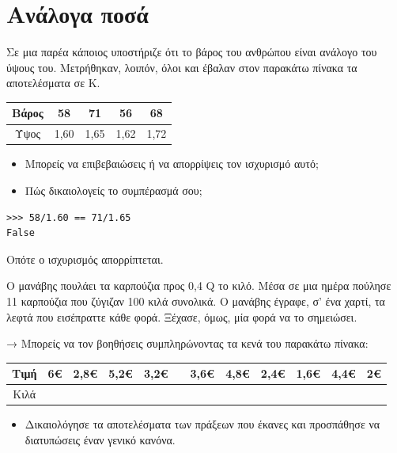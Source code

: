 \section{Ανάλογα ποσά}
\begin{exercise}
Σε	μια	παρέα	κάποιος	υποστήριζε	ότι	το	βάρος	του	ανθρώπου	είναι	ανάλογο	του	ύψους	του. Μετρήθηκαν,	λοιπόν,	όλοι	και	έβαλαν	στον	παρακάτω	πίνακα	τα	αποτελέσματα σε Κ.
\begin{table}
\begin{tabular}{|c|c|c|c|c|}
\hline
Βάρος& 58& 71& 56& 68\\\hline
Ύψος & 1,60&1,65&1,62&1,72\\\hline
\end{tabular}
\end{table}
\begin{itemize}
\item Μπορείς	να	επιβεβαιώσεις	ή	να	απορρίψεις	τον		ισχυρισμό	αυτό;		
\item Πώς	δικαιολογείς	το	συμπέρασμά	σου;
\end{itemize}
\end{exercise}
\begin{lstlisting}
>>> 58/1.60 == 71/1.65
False
\end{lstlisting}
Οπότε ο ισχυρισμός απορρίπτεται.
\begin{exercise}
O	μανάβης	πουλάει	τα	καρπούζια	προς	0,4	Q
	το	κιλό.	Μέσα	σε	μια	ημέρα	πούλησε	11	καρπούζια	που	ζύγιζαν	100	κιλά	συνολικά.	Ο	μανάβης	έγραφε,	σ’	ένα	χαρτί,	τα	λεφτά	που	 εισέπραττε	κάθε	φορά.	Ξέχασε,	όμως,	μία	φορά	να	το	σημειώσει.

→		Μπορείς	να	τον	βοηθήσεις	συμπληρώνοντας 	τα	κενά	του	παρακάτω	πίνακα: 
\begin{table}
\begin{tabular}{|c|c|c|c|c|c|c|c|c|c|c|c|}
\hline
Tιμή& 6€ & 2,8€ & 5,2€ & 3,2€ & & 3,6€ & 4,8€ & 2,4€ & 1,6€ & 4,4€ & 2€\\\hline
Κιλά&       &         &          &         &&            &          &          &        &            &     \\\hline
\end{tabular}
\end{table}    
\begin{itemize}
 \item Δικαιολόγησε τα	αποτελέσματα	των	πράξεων	που 	έκανες	και	προσπάθησε	να		διατυπώσεις	έναν	γενικό	κανόνα. 
\end{itemize}

 \end{exercise}
